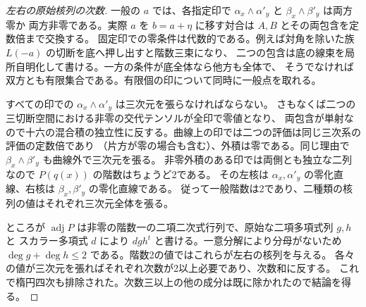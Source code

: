 \begin{proof}[左右の原始核列の次数]
一般の $a$ では、各指定印で $\alpha_x\wedge\alpha'_y$ と $\beta_x\wedge\beta'_y$ は両方零か
両方非零である。実際 $a$ を $b=a+\eta$ に移す対合は $A,B$ とその両包含を定数倍まで交換する。
固定印での零条件は代数的である。例えば対角を除いた族 $L(-a)$ の切断を底へ押し出すと階数三束になり、
二つの包含は底の線束を局所自明化して書ける。一方の条件が底全体なら他方も全体で、
そうでなければ双方とも有限集合である。有限個の印について同時に一般点を取れる。

すべての印での $\alpha_x\wedge\alpha'_y$ は三次元を張らなければならない。
さもなくば二つの三切断空間における非零の交代テンソルが全印で零値となり、
両包含が単射なので十六の混合積の独立性に反する。曲線上の印では二つの評価は同じ三次系の評価の定数倍であり
（片方が零の場合も含む）、外積は零である。同じ理由で $\beta_x\wedge\beta'_y$ も曲線外で三次元を張る。
非零外積のある印では両側とも独立な二列なので $P(q(x))$ の階数はちょうど2である。
その左核は $\alpha_x,\alpha'_y$ の零化直線、右核は $\beta_x,\beta'_y$ の零化直線である。
従って一般階数は2であり、二種類の核列の値はそれぞれ三次元全体を張る。

ところが $\operatorname{adj}P$ は非零の階数一の二項二次式行列で、原始な二項多項式列 $g,h$ と
スカラー多項式 $d$ により $d g h^t$ と書ける。一意分解により分母がないため
$\deg g+\deg h\le2$ である。階数2の値ではこれらが左右の核列を与える。
各々の値が三次元を張ればそれぞれ次数が2以上必要であり、次数和に反する。
これで楕円四次も排除された。次数三以上の他の成分は既に除かれたので結論を得る。
\end{proof}
